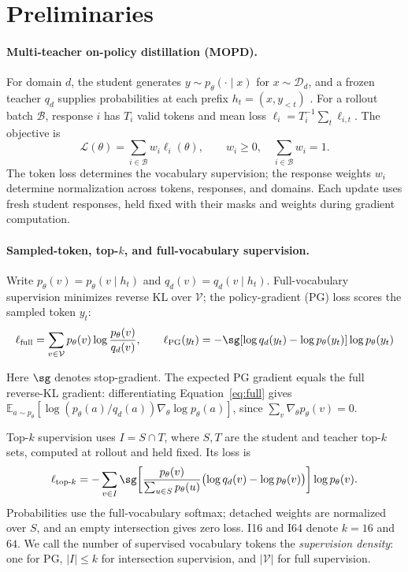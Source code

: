 \section{Preliminaries}
\label{sec:setting}

\paragraph{Multi-teacher on-policy distillation (MOPD).}
For domain $d$, the student generates $y\sim p_\theta(\cdot\mid x)$ for $x\sim\mathcal D_d$, and a frozen teacher $q_d$ supplies probabilities at each prefix $h_t=(x,y_{<t})$ \citep{gao2026openmopddiagnosingfixingcapability}. For a rollout batch $\mathcal B$, response $i$ has $T_i$ valid tokens and mean loss $\ell_i=T_i^{-1}\sum_t\ell_{i,t}$. The objective is
\begin{equation}
\mathcal L(\theta)=\sum_{i\in\mathcal B}w_i\ell_i(\theta),
\qquad w_i\geq0,\quad\sum_{i\in\mathcal B}w_i=1.
\label{eq:mopd}
\end{equation}
The token loss determines the vocabulary supervision; the response weights $w_i$ determine normalization across tokens, responses, and domains. Each update uses fresh student responses, held fixed with their masks and weights during gradient computation.

\paragraph{Sampled-token, top-$k$, and full-vocabulary supervision.}
Write $p_\theta(v)=p_\theta(v\mid h_t)$ and $q_d(v)=q_d(v\mid h_t)$. Full-vocabulary supervision minimizes reverse KL over $\mathcal V$; the policy-gradient (PG) loss scores the sampled token $y_t$:
\begin{equation}
\label{eq:full}
\ell_{\mathrm{full}}=\sum_{v\in\mathcal V}p_\theta(v)\log\frac{p_\theta(v)}{q_d(v)},\qquad
\ell_{\mathrm{PG}}(y_t)=-\sg[\log q_d(y_t)-\log p_\theta(y_t)]\log p_\theta(y_t)
\end{equation}

Here $\sg$ denotes stop-gradient. The expected PG gradient equals the full reverse-KL gradient: differentiating Equation~\ref{eq:full} gives $\mathbb E_{a\sim p_\theta}[\log(p_\theta(a)/q_d(a))\nabla_\theta\log p_\theta(a)]$, since $\sum_v\nabla_\theta p_\theta(v)=0$.

Top-$k$ supervision uses $I=S\cap T$, where $S,T$ are the student and teacher top-$k$ sets, computed at rollout and held fixed. Its loss is
\begin{equation}
\ell_{\mathrm{top}\text{-}k}=-\sum_{v\in I}\sg\!\left[
\frac{p_\theta(v)}{\sum_{u\in S}p_\theta(u)}
\bigl(\log q_d(v)-\log p_\theta(v)\bigr)\right]\log p_\theta(v).
\label{eq:topk}
\end{equation}
Probabilities use the full-vocabulary softmax; detached weights are normalized over $S$, and an empty intersection gives zero loss. I16 and I64 denote $k=16$ and $64$. We call the number of supervised vocabulary tokens the \emph{supervision density}: one for PG, $|I|\leq k$ for intersection supervision, and $|\mathcal V|$ for full supervision.

